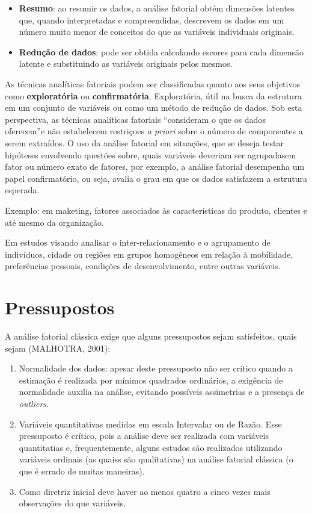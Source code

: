 \documentclass[12pt,brazil,oneside]{book}
\begin{document}
\begin{itemize}
\item
  \textbf{Resumo}: ao resumir os dados, a análise fatorial obtém dimensões latentes que, quando interpretadas e compreendidas, descrevem os dados em um número muito menor de conceitos do que as variáveis individuais originais.
\item
  \textbf{Redução de dados}: pode ser obtida calculando escores para cada dimensão latente e substituindo as variáveis originais pelos mesmos.
\end{itemize}

As técnicas analíticas fatoriais podem ser classificadas quanto aos seus objetivos como \textbf{exploratória} ou \textbf{confirmatória}. Exploratória, útil na busca da estrutura em um conjunto de variáveis ou como um método de redução de dados. Sob esta perspectiva, as técnicas analíticas fatoriais ``consideram o que os dados oferecem''e não estabelecem restriçoes \emph{a priori} sobre o número de componentes a serem extraídos. O uso da análise fatorial em situações, que se deseja testar hipóteses envolvendo questões sobre, quais variáveis deveriam ser agrupadasem fator ou número exato de fatores, por exemplo, a análise fatorial desempenha um papel confirmatório, ou seja, avalia o grau em que os dados satisfazem a estrutura esperada.

Exemplo: em maketing, fatores associados às características do produto, clientes e até mesmo da organização.

Em estudos visando analisar o inter-relacionamento e o agrupamento de indivíduos, cidade ou regiões em grupos homogêneos em relação à mobilidade, preferências pessoais, condições de desenvolvimento, entre outras variáveis.

\hypertarget{pressupostos}{%
\section{Pressupostos}\label{pressupostos}}

A análise fatorial clássica exige que alguns pressupostos sejam satisfeitos, quais sejam (MALHOTRA, 2001):

\begin{enumerate}
\def\labelenumi{\alph{enumi}.}
\item
  Normalidade dos dados: apesar deste pressuposto não ser crítico quando a estimação é realizada por mínimos quadrados ordinários, a exigência de normalidade auxilia na análise, evitando possíveis assimetrias e a presença de \emph{outliers}.
\item
  Variáveis quantitativas medidas em escala Intervalar ou de Razão. Esse pressuposto é crítico, pois a análise deve ser realizada com variáveis quantitatias e, frequentemente, alguns estudos são realizados utilizando variáveis ordinais (as quaiss são qualitativas) na análise fatorial clássica (o que é errado de muitas maneiras).
\item
  Como diretriz inicial deve haver ao menos quatro a cinco vezes mais observações do que variáveis.
\end{enumerate}
\end{document}
